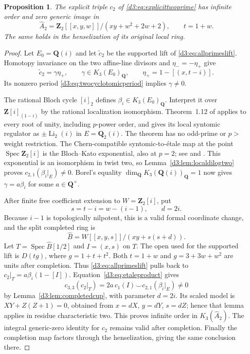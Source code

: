 \documentclass[11pt,a4paper]{amsart}
\numberwithin{equation}{section}
\newtheorem{proposition}[theorem]{Proposition}
\theoremstyle{definition}
\theoremstyle{remark}
\newcommand{\Q}{\mathbf Q}
\newcommand{\Z}{\mathbf Z}
\newcommand{\Spec}{\operatorname{Spec}}
\begin{document}
\begin{proposition}\label{d3:prop:explicittwocomplete}
The explicit triple $c_2$ of \eqref{d3:eq:explicittwoprime} has
infinite order and zero generic image in
\[
 \widehat A_2
 =\Z_2[[x,y,w]]/(xy+w^2+2w+2),\qquad t=1+w.
\]
The same holds in the henselization of its original local ring.
\end{proposition}
\begin{proof}
Let $E_0=\Q(i)$ and let $\widetilde c_2$ be the supported lift
of \eqref{d3:eq:allprimeslift}. Homotopy invariance on the two
affine-line divisors and $\eta_-=-\eta_+$ give
\[
 \widetilde c_2=\gamma\eta_+,\qquad
 \gamma\in K_3(E_0)_{\Q},\qquad
 \eta_+=1-[(x,t-i)].
\]
Its nonzero period \eqref{d3:eq:twocyclotomicperiod} implies
$\gamma\ne0$.

The rational Bloch cycle $[i]_2$ defines
$\beta_i\in K_3(E_0)_{\Q}$. Interpret it over
$\Z[i]_{(1-i)}$ by the rational localization isomorphism.
Theorem~1.12 of \cite{BesserDeJeu} applies to every root of unity,
including $p$-power order, and gives its local syntomic regulator
as $\pm\operatorname{Li}_2(i)$ in $E=\Q_2(i)$.
The theorem has no odd-prime or $p>$weight restriction.
The Chern-compatible syntomic-to-\'etale map at the point
$\Spec\Z_2[i]$ is the Bloch--Kato exponential, also at $p=2$;
see \cite[Example~2.2.4 and Propositions~2.2.7, 2.3.4]{HuberKings}
and \cite[Corollary~5.19 and its proof]{Tamme}.
This exponential is an isomorphism in twist two, so
Lemma~\ref{d3:lem:localdilogtwo} proves
$c_{2,1}(\beta_i|_E)\ne0$.
Borel's equality $\dim_{\Q}K_3(\Q(i))_{\Q}=1$
\cite[Proposition~12.2]{Borel} now gives
$\gamma=a\beta_i$ for some $a\in\Q^\times$.

After finite free coefficient extension to $W=\Z_2[i]$, put
\[
 s=t-i=w-(i-1),\qquad d=2i.
\]
Because $i-1$ is topologically nilpotent, this is a valid formal
coordinate change, and the split completed ring is
\[
 \widehat B=W[[x,y,s]]/(xy+s(s+d)).
\]
Let $T=\Spec\widehat B[1/2]$ and $I=(x,s)$ on $T$.
The open used for the supported lift is $D(tg)$,
where $g=1+t+t^2$. Both $t=1+w$ and
$g=3+3w+w^2$ are units after completion. Thus
\eqref{d3:eq:allprimeslift} pulls back to
$c_2|_T=a\beta_i(1-[I])$.
Equation~\eqref{d3:eq:etaleproduct} gives
\[
 c_{3,3}(c_2|_T)
 =2a\,c_1(I)\smile c_{2,1}(\beta_i|_E)\ne0
\]
by Lemma~\ref{d3:lem:completedcup}, with parameter $d=2i$.
Its scaled model is $XY+Z(Z+1)=0$, obtained from
$x=dX$, $y=dY$, $s=dZ$; hence that lemma applies in residue
characteristic two.
This proves infinite order in $K_3(\widehat A_2)$.
The integral generic-zero identity for $c_2$ remains valid after
completion. Finally the completion map factors through the
henselization, giving the same conclusion there.
\end{proof}
\end{document}
